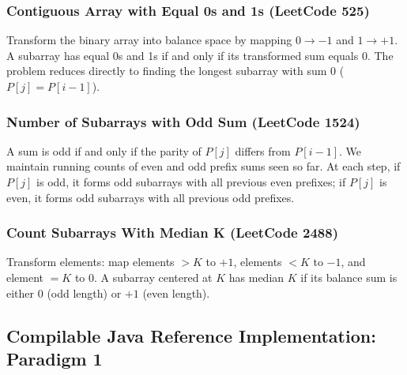 \documentclass[10pt,journal,compsoc,onecolumn]{IEEEtran}
\begin{document}
\subsubsection{Contiguous Array with Equal 0s and 1s (LeetCode 525)}
Transform the binary array into balance space by mapping $0 \to -1$ and $1 \to +1$. A subarray has equal 0s and 1s if and only if its transformed sum equals $0$. The problem reduces directly to finding the longest subarray with sum $0$ ($P[j] = P[i-1]$).

\subsubsection{Number of Subarrays with Odd Sum (LeetCode 1524)}
A sum is odd if and only if the parity of $P[j]$ differs from $P[i-1]$. We maintain running counts of even and odd prefix sums seen so far. At each step, if $P[j]$ is odd, it forms odd subarrays with all previous even prefixes; if $P[j]$ is even, it forms odd subarrays with all previous odd prefixes.

\subsubsection{Count Subarrays With Median K (LeetCode 2488)}
Transform elements: map elements $> K$ to $+1$, elements $< K$ to $-1$, and element $= K$ to $0$. A subarray centered at $K$ has median $K$ if its balance sum is either $0$ (odd length) or $+1$ (even length).

\subsection{Compilable Java Reference Implementation: Paradigm 1}
\end{document}

